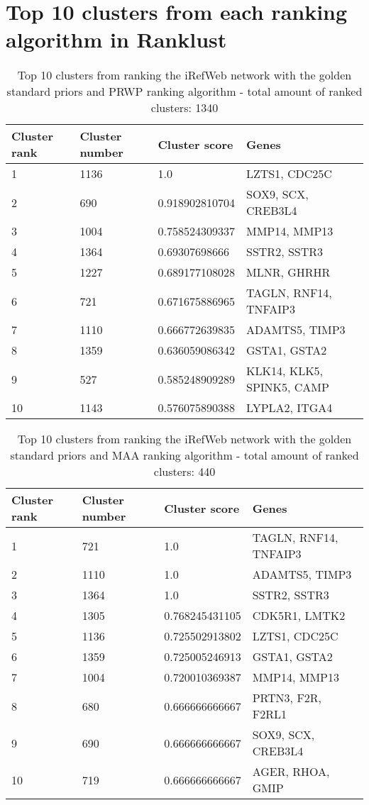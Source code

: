 \section{Top 10 clusters from each ranking algorithm in Ranklust}
\begin{table}[H]
    \begin{tabular}{l l l l}
        \textbf{Cluster rank} & \textbf{Cluster number} & \textbf{Cluster score} & \textbf{Genes} \\
        \hline
        1 & 1136	& 1.0	& LZTS1, CDC25C \\
        2 & 690	& 0.918902810704	& SOX9, SCX, CREB3L4 \\
        3 & 1004	& 0.758524309337	& MMP14, MMP13 \\
        4 & 1364	& 0.69307698666	& SSTR2, SSTR3 \\
        5 & 1227	& 0.689177108028	& MLNR, GHRHR \\
        6 & 721	& 0.671675886965	& TAGLN, RNF14, TNFAIP3 \\
        7 & 1110	& 0.666772639835	& ADAMTS5, TIMP3 \\
        8 & 1359	& 0.636059086342	& GSTA1, GSTA2 \\
        9 & 527	& 0.585248909289	& KLK14, KLK5, SPINK5, CAMP \\
        10 & 1143	& 0.576075890388	& LYPLA2, ITGA4 \\
        \hline
    \end{tabular}
    \caption{Top 10 clusters from ranking the iRefWeb network with the golden
    standard priors and PRWP ranking algorithm - total amount of ranked
    clusters: 1340}
    \label{tab:top10-prwp}
\end{table}
\begin{table}[H]
    \begin{tabular}{l l l l}
        \textbf{Cluster rank} & \textbf{Cluster number} & \textbf{Cluster score} & \textbf{Genes} \\
        \hline
        1 & 721	& 1.0	& TAGLN, RNF14, TNFAIP3 \\
        2 & 1110	& 1.0	& ADAMTS5, TIMP3 \\
        3 & 1364	& 1.0	& SSTR2, SSTR3 \\
        4 & 1305	& 0.768245431105	& CDK5R1, LMTK2 \\
        5 & 1136	& 0.725502913802	& LZTS1, CDC25C \\
        6 & 1359	& 0.725005246913	& GSTA1, GSTA2 \\
        7 & 1004	& 0.720010369387	& MMP14, MMP13 \\
        8 & 680	& 0.666666666667	& PRTN3, F2R, F2RL1 \\
        9 & 690	& 0.666666666667	& SOX9, SCX, CREB3L4 \\
        10 & 719	& 0.666666666667	& AGER, RHOA, GMIP \\
        \hline
    \end{tabular}
    \caption{Top 10 clusters from ranking the iRefWeb network with the golden
    standard priors and MAA ranking algorithm - total amount of ranked
    clusters: 440}
    \label{tab:top10-maa}
\end{table}

